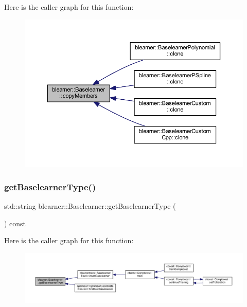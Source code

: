 Here is the caller graph for this function\+:\nopagebreak
\begin{figure}[H]
\begin{center}
\leavevmode
\includegraphics[width=350pt]{classblearner_1_1_baselearner_ae8f114ca7c497f03c80de5981c7f811d_icgraph}
\end{center}
\end{figure}
\mbox{\label{classblearner_1_1_baselearner_acec1a791f94eed39d2662c245e7f6b51}} 
\subsubsection{\texorpdfstring{get\+Baselearner\+Type()}{getBaselearnerType()}}
{\footnotesize\ttfamily std\+::string blearner\+::\+Baselearner\+::get\+Baselearner\+Type (\begin{DoxyParamCaption}{ }\end{DoxyParamCaption}) const}

Here is the caller graph for this function\+:
\nopagebreak
\begin{figure}[H]
\begin{center}
\leavevmode
\includegraphics[width=350pt]{classblearner_1_1_baselearner_acec1a791f94eed39d2662c245e7f6b51_icgraph}
\end{center}
\end{figure}
\mbox{\label{classblearner_1_1_baselearner_a2393dc1e3cf90919ebbbd237fe303860}} 
